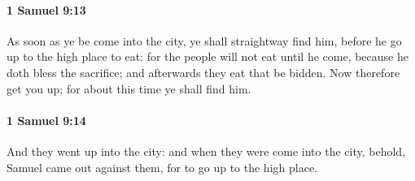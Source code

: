 		\paragraph{1 Samuel 9:13} %
			\label{1SAMUEL-9-13}

			As soon as ye be come into the city, ye shall straightway find him, before he go up to the high place to eat: for the people will not eat until he come, because he doth bless the sacrifice; and afterwards they eat that be bidden. Now therefore get you up; for about this time ye shall find him.


		\paragraph{1 Samuel 9:14} %
			\label{1SAMUEL-9-14}

			And they went up into the city: and when they were come into the city, behold, Samuel came out against them, for to go up to the high place.

